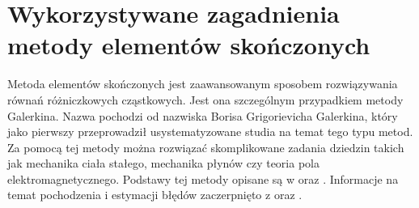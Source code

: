 
\chapter{Wykorzystywane zagadnienia metody elementów skończonych}
\label{cha:MES_chapter}
Metoda elementów skończonych jest zaawansowanym sposobem rozwiązywania równań różniczkowych cząstkowych. Jest ona szczególnym przypadkiem metody Galerkina. Nazwa pochodzi od nazwiska Borisa Grigorievicha Galerkina, który jako pierwszy przeprowadził usystematyzowane studia na temat tego typu metod. Za pomocą tej metody można rozwiązać skomplikowane zadania dziedzin takich jak mechanika ciała stałego, mechanika płynów czy teoria pola elektromagnetycznego. Podstawy tej metody opisane są w \cite{bartek_srodka} oraz \cite{bartek_gavin}. Informacje na temat pochodzenia i estymacji błędów zaczerpnięto z \cite{bartek_pointer} oraz \cite{bartek_erke}.





































